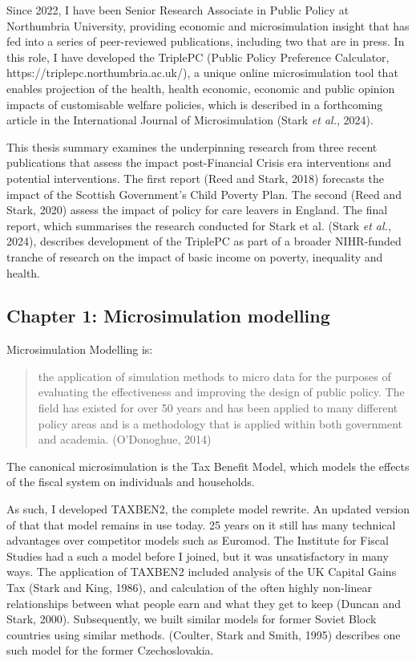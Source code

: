 \documentclass[
  letterpaper,
  DIV=11,
  numbers=noendperiod]{scrartcl}
\begin{document}
Since 2022, I have been Senior Research Associate in Public Policy at
Northumbria University, providing economic and microsimulation insight
that has fed into a series of peer-reviewed publications, including two
that are in press. In this role, I have developed the TriplePC (Public
Policy Preference Calculator, https://triplepc.northumbria.ac.uk/), a
unique online microsimulation tool that enables projection of the
health, health economic, economic and public opinion impacts of
customisable welfare policies, which is described in a forthcoming
article in the International Journal of Microsimulation (Stark \emph{et
al.}, 2024).

This thesis summary examines the underpinning research from three recent
publications that assess the impact post-Financial Crisis era
interventions and potential interventions. The first report (Reed and
Stark, 2018) forecasts the impact of the Scottish Government's Child
Poverty Plan. The second (Reed and Stark, 2020) assess the impact of
policy for care leavers in England. The final report, which summarises
the research conducted for Stark et al. (Stark \emph{et al.}, 2024),
describes development of the TriplePC as part of a broader NIHR-funded
tranche of research on the impact of basic income on poverty, inequality
and health.

\subsection{Chapter 1: Microsimulation
modelling}\label{chapter-1-microsimulation-modelling}

Microsimulation Modelling is:

\begin{quote}
the application of simulation methods to micro data for the purposes of
evaluating the effectiveness and improving the design of public policy.
The field has existed for over 50 years and has been applied to many
different policy areas and is a methodology that is applied within both
government and academia. (O'Donoghue, 2014)
\end{quote}

The canonical microsimulation is the Tax Benefit Model, which models the
effects of the fiscal system on individuals and households.

As such, I developed TAXBEN2, the complete model rewrite. An updated
version of that that model remains in use today. 25 years on it still
has many technical advantages over competitor models such as Euromod.
The Institute for Fiscal Studies had a such a model before I joined, but
it was unsatisfactory in many ways. The application of TAXBEN2 included
analysis of the UK Capital Gains Tax (Stark and King, 1986), and
calculation of the often highly non-linear relationships between what
people earn and what they get to keep (Duncan and Stark, 2000).
Subsequently, we built similar models for former Soviet Block countries
using similar methods. (Coulter, Stark and Smith, 1995) describes one
such model for the former Czechoslovakia.
\end{document}
